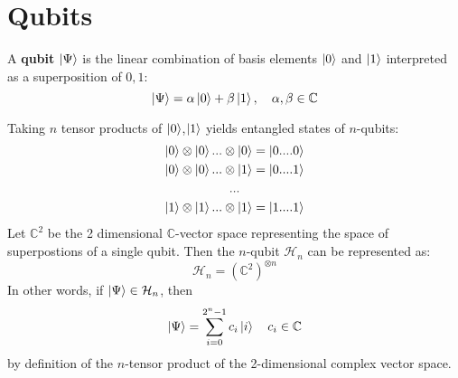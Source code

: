 \documentclass{../quantum.tex}
\begin{document}
\section{Qubits}

A {\bf qubit} $\ket{\Psi}$ is the linear combination of basis elements $\ket{0}$ and $\ket{1}$ interpreted as a superposition of $0,1$:
$$ \ket{\Psi} = \alpha \ket{0} + \beta \ket{1}, \quad \alpha,\beta \in \mathbb{C}$$

Taking $n$ tensor products of $\ket{0}$,$\ket{1}$ yields entangled states of $n$-qubits:
\begin{gather*}
  \ket{0} \otimes \ket{0} ... \otimes \ket{0} = \ket{0....0} \\   \ket{0} \otimes \ket{0} ... \otimes \ket{1} = \ket{0....1} \\
  ... \\
    \ket{1} \otimes \ket{1} ... \otimes \ket{1} = \ket{1....1}
\end{gather*}
Let $\mathbb{C}^2$ be the 2 dimensional $\mathbb{C}$-vector space representing the space of superpostions of a single qubit. Then the $n$-qubit $\mathcal{H}_n$ can be represented as:
$$\mathcal{H}_n = (\mathbb{C}^2)^{\otimes n}  $$ In other words, if $\ket{\Psi} \in \mathcal{H}_n$, then
$$ \ket{\Psi} = \sum_{i= 0}^{2^n -1} c_i \ket{i} \quad c_i \in \mathbb{C} $$
by definition of the $n$-tensor product of the 2-dimensional complex vector space.
\end{document}
